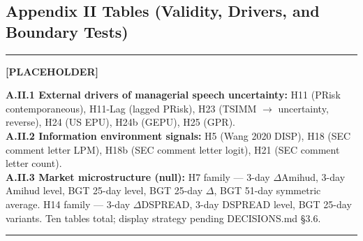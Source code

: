 \documentclass[11pt,a4paper,twocolumn]{article}
\newenvironment{placeholder}{%
  \par\medskip\noindent%
  {\color{placeholderaccent}\rule{\linewidth}{0.4pt}}\par%
  \noindent\textbf{\color{placeholderaccent}[PLACEHOLDER]}\par%
  \smallskip\itshape%
}{%
  \par\upshape\smallskip%
  {\color{placeholderaccent}\rule{\linewidth}{0.4pt}}\par\medskip%
}
\begin{document}
\subsection*{Appendix II Tables (Validity, Drivers, and Boundary Tests)}
\begin{placeholder}
\textbf{A.II.1 External drivers of managerial speech uncertainty:}
H11 (PRisk contemporaneous), H11-Lag (lagged PRisk), H23 (TSIMM
$\to$ uncertainty, reverse), H24 (US EPU), H24b (GEPU), H25 (GPR).\\
\textbf{A.II.2 Information environment signals:}
H5 (Wang 2020 DISP), H18 (SEC comment letter LPM), H18b (SEC comment
letter logit), H21 (SEC comment letter count).\\
\textbf{A.II.3 Market microstructure (null):}
H7 family --- 3-day $\Delta$Amihud, 3-day Amihud level, BGT 25-day
level, BGT 25-day $\Delta$, BGT 51-day symmetric average.
H14 family --- 3-day $\Delta$DSPREAD, 3-day DSPREAD level, BGT 25-day
variants. Ten tables total; display strategy pending DECISIONS.md
\S3.6.
\end{placeholder}
\end{document}
